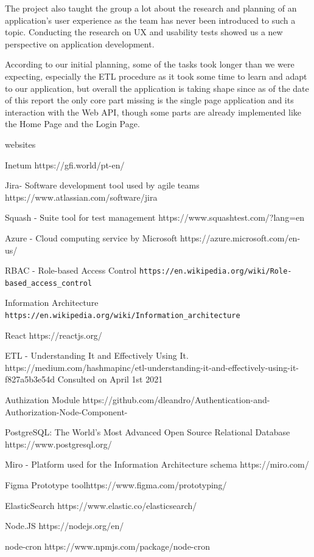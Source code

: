 \documentclass[a4paper,twoside,10pt]{report}
\begin{document}
The project also taught the group a lot about the research and planning of an application's user experience as the team has never been introduced to such a topic. Conducting the research on UX and usability tests showed us a new perspective on application development.

According to our initial planning, some of the tasks took longer than we were expecting, especially the ETL procedure as it took some time to learn and adapt to our application, but overall the application is taking shape since as of the date of this report the only core part missing is the single page application and its interaction with the Web API, though some parts are already implemented like the Home Page and the Login Page.





\begin{thebibliography} {websites}

 Inetum https://gfi.world/pt-en/

 Jira- Software development tool used by agile teams
https://www.atlassian.com/software/jira

 Squash - Suite tool for test management
https://www.squashtest.com/?lang=en

 Azure - Cloud computing service by Microsoft
https://azure.microsoft.com/en-us/

 RBAC - Role-based Access Control
\texttt{https://en.wikipedia.org/wiki/Role-based\_access\_control}

 Information Architecture
\texttt{https://en.wikipedia.org/wiki/Information\_architecture}

 React https://reactjs.org/

 ETL - Understanding It and Effectively Using It.
https://medium.com/hashmapinc/etl-understanding-it-and-effectively-using-it-f827a5b3e54d
Consulted on April 1st 2021

 Authization Module
https://github.com/dleandro/Authentication-and-Authorization-Node-Component-

 PostgreSQL: The World's Most Advanced Open Source Relational Database
https://www.postgresql.org/

 Miro - Platform used for the Information Architecture schema
https://miro.com/

 Figma Prototype toolhttps://www.figma.com/prototyping/

 ElasticSearch  https://www.elastic.co/elasticsearch/

 Node.JS  https://nodejs.org/en/

 node-cron  https://www.npmjs.com/package/node-cron
\end{thebibliography}
\end{document}
